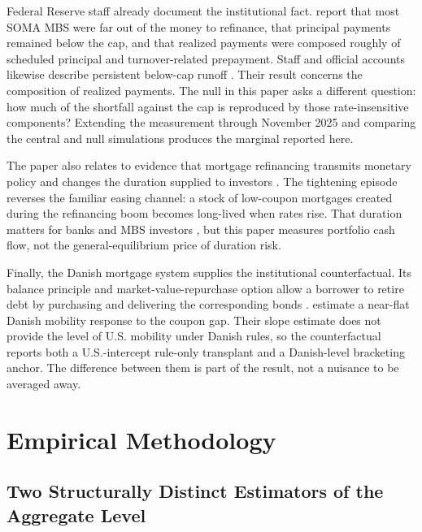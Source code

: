 \documentclass[12pt]{article}
\begin{document}
Federal Reserve staff already document the institutional fact. \citet{na2024}
report that most SOMA MBS were far out of the money to refinance, that principal
payments remained below the cap, and that realized payments were composed
roughly of scheduled principal and turnover-related prepayment. Staff and
official accounts likewise describe persistent below-cap runoff
\citep{nyfed2022,perli2024,hammack2025}. Their result concerns the composition
of realized payments. The null in this paper asks a different question: how
much of the shortfall against the cap is reproduced by those rate-insensitive
components? Extending the measurement through November 2025 and comparing the
central and null simulations produces the marginal reported here.

The paper also relates to evidence that mortgage refinancing transmits monetary
policy and changes the duration supplied to investors
\citep{dimaggio2020,berger2021,eichenbaum2022,krishnamurthy2011,vayanos2021}.
The tightening episode reverses the familiar easing channel: a stock of
low-coupon mortgages created during the refinancing boom becomes long-lived
when rates rise. That duration matters for banks and MBS investors
\citep{jiang2023,malkhozov2016}, but this paper measures portfolio cash flow,
not the general-equilibrium price of duration risk.

Finally, the Danish mortgage system supplies the institutional counterfactual.
Its balance principle and market-value-repurchase option allow a borrower to
retire debt by purchasing and delivering the corresponding bonds
\citep{berg2018,frankel2004,svenstrup2006}. \citet{berger2026} estimate a
near-flat Danish mobility response to the coupon gap. Their slope estimate does
not provide the level of U.S. mobility under Danish rules, so the
counterfactual reports both a U.S.-intercept rule-only transplant and a
Danish-level bracketing anchor. The difference between them is part of the
result, not a nuisance to be averaged away.

\section{Empirical Methodology}\label{sec:method}

\subsection{Two Structurally Distinct Estimators of the Aggregate Level}\label{sec:method-estimators}
\end{document}

